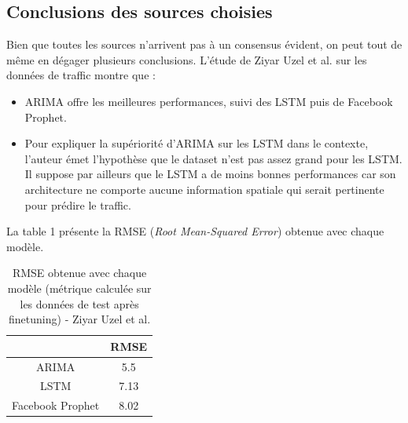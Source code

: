 \documentclass[french]{article}
\begin{document}
    \subsection{Conclusions des sources choisies}
    Bien que toutes les sources n'arrivent pas à un consensus évident, on peut tout de même en dégager plusieurs conclusions.
    L'étude de Ziyar Uzel et al.\cite{uzel} sur les données de traffic montre que :
    \begin{itemize}
        \item ARIMA offre les meilleures performances, suivi des LSTM puis de Facebook Prophet.
        \item Pour expliquer la supériorité d'ARIMA sur les LSTM dans le contexte, l'auteur émet l'hypothèse que le dataset n'est pas assez grand pour les LSTM. Il suppose par ailleurs que le LSTM a de moins bonnes performances car son architecture ne comporte aucune information spatiale qui serait pertinente pour prédire le traffic.
    \end{itemize}
    La table 1 présente la RMSE (\textit{Root Mean-Squared Error}) obtenue avec chaque modèle.
    \begin{table}[h!]
        \begin{center}
            \begin{tabular}{ |c|c| }
                \hline
                 & RMSE \\
                \hline
                ARIMA & 5.5 \\ 
                \hline
                LSTM & 7.13 \\  
                \hline
                Facebook Prophet & 8.02 \\
                \hline
            \end{tabular}
            \caption{RMSE obtenue avec chaque modèle (métrique calculée sur les données de test après finetuning) - Ziyar Uzel et al.}
            \label{table:1}
        \end{center}
    \end{table}
    
\end{document}
